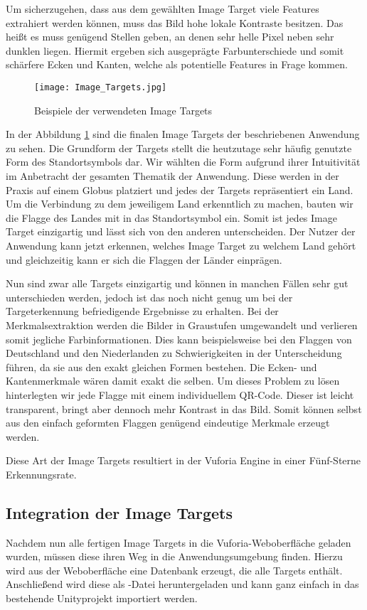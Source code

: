 Um sicherzugehen, dass aus dem gewählten Image Target viele Features extrahiert werden können, muss das Bild hohe lokale Kontraste besitzen. Das heißt es muss genügend Stellen geben, an denen sehr helle Pixel neben sehr dunklen liegen. 
Hiermit ergeben sich ausgeprägte Farbunterschiede und somit schärfere Ecken und Kanten, welche als potentielle Features in Frage kommen.

\begin{figure} [h]
\centering
\texttt{[image: Image\_Targets.jpg]}
\caption{Beispiele der verwendeten Image Targets}
\label{fig:image_targets}
\end{figure}

In der Abbildung \ref{fig:image_targets} sind die finalen Image Targets der beschriebenen Anwendung zu sehen.
Die Grundform der Targets stellt die heutzutage sehr häufig genutzte Form des Standortsymbols dar.
Wir wählten die Form aufgrund ihrer Intuitivität im Anbetracht der gesamten Thematik der Anwendung.
Diese werden in der Praxis auf einem Globus platziert und jedes der Targets repräsentiert ein Land.
Um die Verbindung zu dem jeweiligem Land erkenntlich zu machen, bauten wir die Flagge des Landes mit in das Standortsymbol ein. 
Somit ist jedes Image Target einzigartig und lässt sich von den anderen unterscheiden. 
Der Nutzer der Anwendung kann jetzt erkennen, welches Image Target zu welchem Land gehört und gleichzeitig kann er sich die Flaggen der Länder einprägen. 

Nun sind zwar alle Targets einzigartig und können in manchen Fällen sehr gut unterschieden werden, jedoch ist das noch nicht genug um bei der Targeterkennung befriedigende Ergebnisse zu erhalten. 
Bei der Merkmalsextraktion werden die Bilder in Graustufen umgewandelt und verlieren somit jegliche Farbinformationen. Dies kann beispielsweise bei den Flaggen von Deutschland und den Niederlanden zu Schwierigkeiten in der Unterscheidung führen, da sie aus den exakt gleichen Formen bestehen. 
Die Ecken- und Kantenmerkmale wären damit exakt die selben. 
Um dieses Problem zu lösen hinterlegten wir jede Flagge mit einem individuellem QR-Code. Dieser ist leicht transparent, bringt aber dennoch mehr Kontrast in das Bild. 
Somit können selbst aus den einfach geformten Flaggen genügend eindeutige Merkmale erzeugt werden.

Diese Art der Image Targets resultiert in der Vuforia Engine in einer Fünf-Sterne Erkennungsrate.

\subsection{Integration der Image Targets}\label{integration_image_targets}
Nachdem nun alle fertigen Image Targets in die Vuforia-Weboberfläche geladen wurden, müssen diese ihren Weg in die Anwendungsumgebung finden.
Hierzu wird aus der Weboberfläche eine Datenbank erzeugt, die alle Targets enthält. 
Anschließend wird diese als -Datei heruntergeladen und kann ganz einfach in das bestehende Unityprojekt importiert werden.

